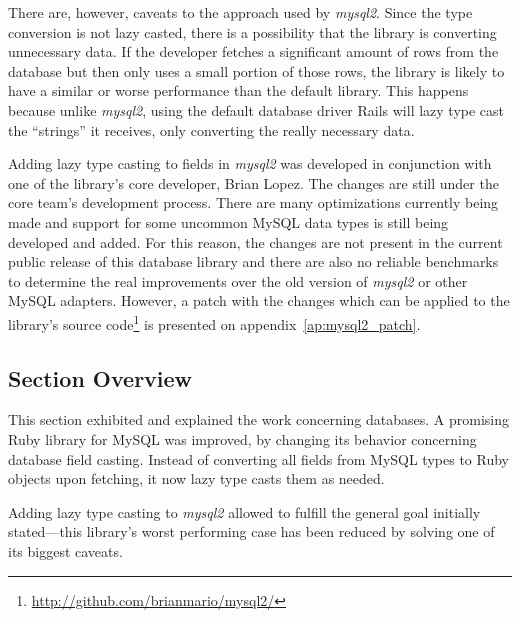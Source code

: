 There are, however, caveats to the approach used by \textit{mysql2}. Since the type conversion is not lazy casted, there is a possibility that the library is converting unnecessary data. If the developer fetches a significant amount of rows from the database but then only uses a small portion of those rows, the library is likely to have a similar or worse performance than the default library. This happens because unlike \textit{mysql2}, using the default database driver Rails will lazy type cast the ``strings'' it receives, only converting the really necessary data.

Adding lazy type casting to fields in \textit{mysql2} was developed in conjunction with one of the library's core developer, Brian Lopez. The changes are still under the core team's development process. There are many optimizations currently being made and support for some uncommon MySQL data types is still being developed and added. For this reason, the changes are not present in the current public release of this database library and there are also no reliable benchmarks to determine the real improvements over the old version of \textit{mysql2} or other MySQL adapters. However, a patch with the changes which can be applied to the library's source code\footnote{\url{http://github.com/brianmario/mysql2/}} is presented on appendix~\ref{ap:mysql2_patch}.


\subsection{Section Overview}
This section exhibited and explained the work concerning databases. A promising Ruby library for MySQL was improved, by changing its behavior concerning database field casting. Instead of converting all fields from MySQL types to Ruby objects upon fetching, it now lazy type casts them as needed.

Adding lazy type casting to \textit{mysql2} allowed to fulfill the general goal initially stated---this library's worst performing case has been reduced by solving one of its biggest caveats.

